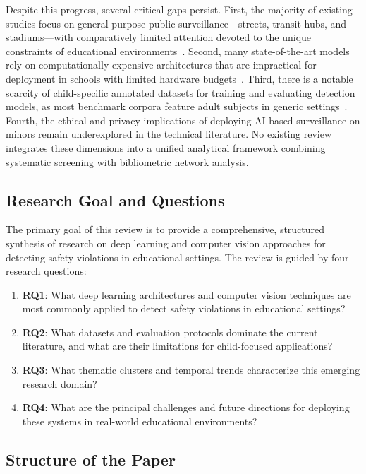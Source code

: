 \documentclass[conference]{IEEEtran}
\begin{document}
Despite this progress, several critical gaps persist. First, the majority of existing studies focus on general-purpose public surveillance---streets, transit hubs, and stadiums---with comparatively limited attention devoted to the unique constraints of educational environments~\cite{b11,b12}. Second, many state-of-the-art models rely on computationally expensive architectures that are impractical for deployment in schools with limited hardware budgets~\cite{b13,b14}. Third, there is a notable scarcity of child-specific annotated datasets for training and evaluating detection models, as most benchmark corpora feature adult subjects in generic settings~\cite{b15,b16}. Fourth, the ethical and privacy implications of deploying AI-based surveillance on minors remain underexplored in the technical literature. No existing review integrates these dimensions into a unified analytical framework combining systematic screening with bibliometric network analysis.

\subsection{Research Goal and Questions}

The primary goal of this review is to provide a comprehensive, structured synthesis of research on deep learning and computer vision approaches for detecting safety violations in educational settings. The review is guided by four research questions:

\begin{enumerate}
\item \textbf{RQ1}: What deep learning architectures and computer vision techniques are most commonly applied to detect safety violations in educational settings?
\item \textbf{RQ2}: What datasets and evaluation protocols dominate the current literature, and what are their limitations for child-focused applications?
\item \textbf{RQ3}: What thematic clusters and temporal trends characterize this emerging research domain?
\item \textbf{RQ4}: What are the principal challenges and future directions for deploying these systems in real-world educational environments?
\end{enumerate}

\subsection{Structure of the Paper}
\end{document}
